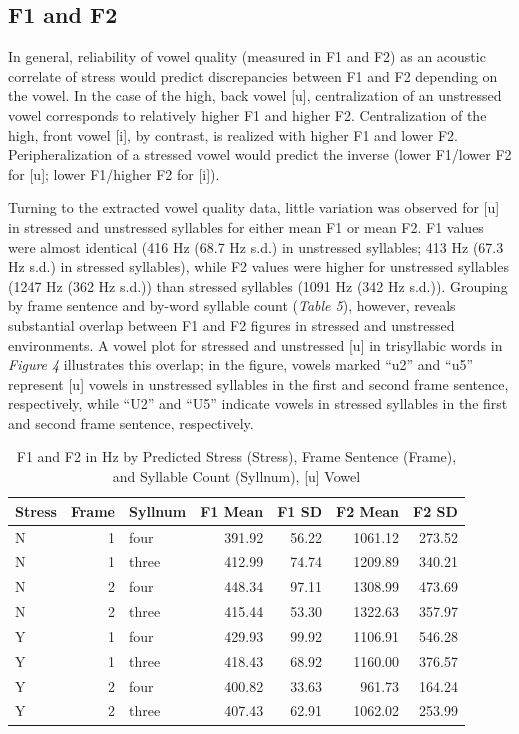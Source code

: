 \documentclass[english,man]{apa6}
\theoremstyle{definition}
\theoremstyle{definition}
\theoremstyle{definition}
\theoremstyle{remark}
\begin{document}
\subsection{F1 and F2}\label{f1-and-f2}

In general, reliability of vowel quality (measured in F1 and F2) as an
acoustic correlate of stress would predict discrepancies between F1 and
F2 depending on the vowel. In the case of the high, back vowel {[}u{]},
centralization of an unstressed vowel corresponds to relatively higher
F1 and higher F2. Centralization of the high, front vowel {[}i{]}, by
contrast, is realized with higher F1 and lower F2. Peripheralization of
a stressed vowel would predict the inverse (lower F1/lower F2 for
{[}u{]}; lower F1/higher F2 for {[}i{]}).

Turning to the extracted vowel quality data, little variation was
observed for {[}u{]} in stressed and unstressed syllables for either
mean F1 or mean F2. F1 values were almost identical (416 Hz (68.7 Hz
s.d.) in unstressed syllables; 413 Hz (67.3 Hz s.d.) in stressed
syllables), while F2 values were higher for unstressed syllables (1247
Hz (362 Hz s.d.)) than stressed syllables (1091 Hz (342 Hz s.d.)).
Grouping by frame sentence and by-word syllable count
(\textit{Table 5}), however, reveals substantial overlap between F1 and
F2 figures in stressed and unstressed environments. A vowel plot for
stressed and unstressed {[}u{]} in trisyllabic words in
\textit{Figure 4} illustrates this overlap; in the figure, vowels marked
\enquote{u2} and \enquote{u5} represent {[}u{]} vowels in unstressed
syllables in the first and second frame sentence, respectively, while
\enquote{U2} and \enquote{U5} indicate vowels in stressed syllables in
the first and second frame sentence, respectively.

\begin{table}

\caption{\label{tab:Table5}F1 and F2 in Hz by Predicted Stress (Stress), Frame Sentence (Frame), and Syllable Count (Syllnum), [u] Vowel}
\centering
\begin{tabular}[t]{l|r|l|r|r|r|r}
\hline
Stress & Frame & Syllnum & F1 Mean & F1 SD & F2 Mean & F2 SD\\
\hline
N & 1 & four & 391.92 & 56.22 & 1061.12 & 273.52\\
\hline
N & 1 & three & 412.99 & 74.74 & 1209.89 & 340.21\\
\hline
N & 2 & four & 448.34 & 97.11 & 1308.99 & 473.69\\
\hline
N & 2 & three & 415.44 & 53.30 & 1322.63 & 357.97\\
\hline
Y & 1 & four & 429.93 & 99.92 & 1106.91 & 546.28\\
\hline
Y & 1 & three & 418.43 & 68.92 & 1160.00 & 376.57\\
\hline
Y & 2 & four & 400.82 & 33.63 & 961.73 & 164.24\\
\hline
Y & 2 & three & 407.43 & 62.91 & 1062.02 & 253.99\\
\hline
\end{tabular}
\end{table}
\end{document}
